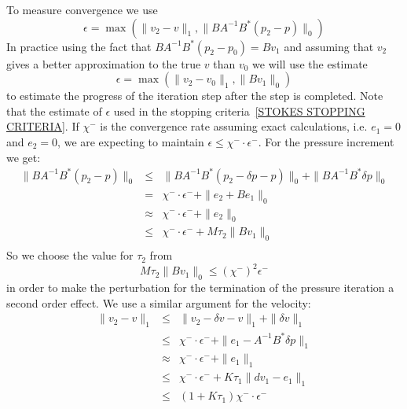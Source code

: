 To measure convergence we use
\begin{equation} 
\epsilon = \max(\|v_{2}-v\|_{1}, \|B A^{-1} B^{*} (p_{2}-p)\|_{0})
\end{equation}
In practice using the fact that $B A^{-1} B^{*} (p_{2}-p_{0}) = B v_{1}$
and assuming that $v_{2}$ gives a better approximation to the true $v$ than
$v_{0}$ we will use the estimate
\begin{equation} 
\epsilon = \max(\|v_{2}-v_{0}\|_{1}, \|B v_{1}\|_{0})
\end{equation}
to estimate the progress of the iteration step after the step is completed. 
Note that the estimate of $\epsilon$   
used in the stopping criteria~\ref{STOKES STOPPING CRITERIA}. If $\chi^{-}$ is the convergence rate assuming
exact calculations, i.e. $e_{1}=0$ and $e_{2}=0$, we are expecting 
to maintain $\epsilon \le \chi^{-} \cdot \epsilon^{-}$. For the 
pressure increment we get:
\begin{equation} \label{STOKES EST 1}
\begin{array}{rcl}
\|B A^{-1} B^{*} (p_{2}-p)\|_{0}
 & \le & \|B A^{-1} B^{*} (p_{2}-\delta p-p)\|_{0} +
\|B A^{-1} B^{*} \delta p\|_{0} \\
 & = & \chi^{-} \cdot \epsilon^{-} + \|e_{2} + B e_{1}\|_{0}  \\
& \approx & \chi^{-} \cdot \epsilon^{-} + \|e_{2}\|_{0} \\
& \le & \chi^{-} \cdot \epsilon^{-} + M \tau_{2} \|B v_{1}\|_{0} \\  
\end{array}
\end{equation}
So we choose the value for $\tau_{2}$ from 
\begin{equation} \label{STOKES TOL2}
 M \tau_{2} \|B v_{1}\|_{0}  \le (\chi^{-})^2 \epsilon^{-}
\end{equation}
in order to make the perturbation for the termination of the pressure iteration a second order effect. We use a
similar argument for the velocity:
\begin{equation}\label{STOKES EST 2}
\begin{array}{rcl}
\|v_{2}-v\|_{1} & \le & \|v_{2}-\delta v-v\|_{1} + \| \delta v\|_{1} \\
& \le &  \chi^{-} \cdot \epsilon^{-}  + \| e_{1} -  A^{-1} B^{*}\delta p \|_{1} \\
& \approx &  \chi^{-} \cdot \epsilon^{-}  + \| e_{1} \|_{1} \\
& \le &  \chi^{-} \cdot \epsilon^{-}  +  K \tau_{1} \| dv_{1} - e_{1} \|_{1}
\\
& \le &  ( 1  + K \tau_{1}) \chi^{-} \cdot \epsilon^{-}
\end{array}
\end{equation}
